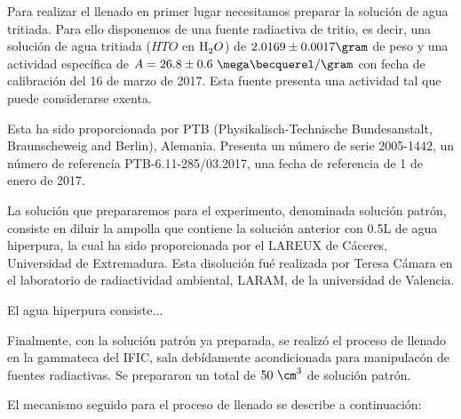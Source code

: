 Para realizar el llenado en primer lugar necesitamos preparar la solución de agua tritiada. Para ello disponemos de una fuente radiactiva de tritio, es decir, una solución de agua tritiada ($HTO$ en $\ce{H_2}O$) de $2.0169 \pm 0.0017\gram$ de peso y una actividad específica de $A=26.8 \pm 0.6~\mega\becquerel/\gram$ con fecha de calibración del 16 de marzo de 2017. Esta fuente presenta una actividad tal que puede considerarse exenta.

Esta ha sido proporcionada por PTB (Physikalisch-Technische Bundesanstalt, Braunscheweig and Berlin), Alemania. Presenta un número de serie 2005-1442, un número de referencía PTB-6.11-285/03.2017, una fecha de referencia de 1 de enero de 2017.

La solución que prepararemos para el experimento, denominada solución patrón, consiste en diluir la ampolla que contiene la solución anterior con 0.5L de agua hiperpura, la cual ha sido proporcionada por el LAREUX de Cáceres, Universidad de Extremadura. Esta disolución fué realizada por Teresa Cámara en el laboratorio de radiactividad ambiental, LARAM, de la universidad de Valencia.

El agua hiperpura consiste...

Finalmente, con la solución patrón ya preparada, se realizó el proceso de llenado en la gammateca del IFIC, sala debídamente acondicionada para manipulacón de fuentes radiactivas. Se prepararon un total de $50~\cm^3$ de solución patrón.

El mecanismo seguido para el proceso de llenado se describe a continuación:

